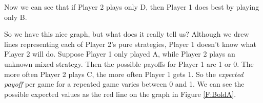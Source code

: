 \begin{itemize}
\begin{itemize}
\begin{figure}
\begin{center}
   \label{F:Player 2's pure strategy D}
\end{center}   
\end{figure}

Now we can see that if Player 2 plays only D, then Player 1 does best by playing only B.
\end{itemize}

\end{itemize}

So we have this nice graph, but what does it really tell us? Although we drew lines representing each of Player 2's pure strategies, Player 1 doesn't know what Player 2 will do. Suppose Player 1 only played A, while Player 2 plays an unknown mixed strategy. Then the possible payoffs for Player 1 are 1 or 0. The more often Player 2 plays C, the more often Player 1 gets 1. So the \emph{expected payoff} per game for a repeated game varies between 0 and 1. We can see the possible expected values as the red line on the graph in Figure \ref{F:BoldA}.



